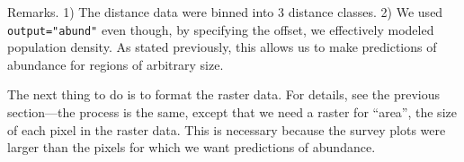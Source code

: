 \documentclass[a4paper]{article}
\renewenvironment{Schunk}{\vspace{\topsep}}{\vspace{\topsep}}
\begin{document}
Remarks. 1) The distance data were binned into 3 distance classes. 2)
We used \verb+output="abund"+ even though, by specifying the offset,
we effectively modeled population density. As stated previously, this
allows us to make predictions of abundance for regions of arbitrary size.

The next thing to do is to format the raster data. For details, see
the previous section---the process is the same, except that we need a
raster for ``area'', the size of each pixel in the raster data. This
is necessary because the survey plots were larger than the pixels for
which we want predictions of abundance.
\end{document}
